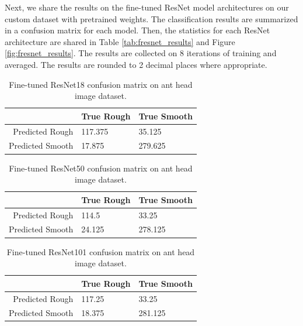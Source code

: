 \documentclass{aci}
\numberwithin{equation}{section}
\begin{document}
Next, we share the results on the fine-tuned ResNet model architectures on our
custom dataset with pretrained weights. The classification results are
summarized in a confusion matrix for each model. Then, the statistics for each
ResNet architecture are shared in Table \ref{tab:fresnet_results} and Figure
\ref{fig:fresnet_results}. The results are collected on 8 iterations of training
and averaged. The results are rounded to 2 decimal places where appropriate.

\begin{table}[h]
    \centering
    \caption{Fine-tuned ResNet18 confusion matrix on ant head image dataset.}
    \begin{tabular}{r|ll}
                         & True Rough & True Smooth \\
        \hline
        Predicted Rough  & 117.375    & 35.125      \\
        Predicted Smooth & 17.875     & 279.625     \\
    \end{tabular}
    \label{tab:fresnet18_confusion_matrix}
\end{table}

\vspace{0.5in}

\begin{table}[h]
    \centering
    \caption{Fine-tuned ResNet50 confusion matrix on ant head image dataset.}
    \begin{tabular}{r|ll}
                         & True Rough & True Smooth \\
        \hline
        Predicted Rough  & 114.5      & 33.25       \\
        Predicted Smooth & 24.125     & 278.125     \\
    \end{tabular}
    \label{tab:fresnet50_confusion_matrix}
\end{table}

\vspace{0.5in}

\begin{table}[h]
    \centering
    \caption{Fine-tuned ResNet101 confusion matrix on ant head image dataset.}
    \begin{tabular}{r|ll}
                         & True Rough & True Smooth \\
        \hline
        Predicted Rough  & 117.25     & 33.25       \\
        Predicted Smooth & 18.375     & 281.125     \\
    \end{tabular}
    \label{tab:fresnet101_confusion_matrix}
\end{table}
\end{document}
